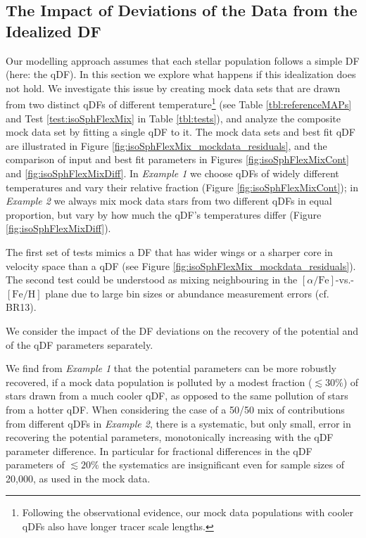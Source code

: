 \subsection{The Impact of Deviations of the Data from the Idealized DF} \label{sec:results_mixedDFs}

Our modelling approach assumes that each stellar population follows a simple DF (here: the qDF). In this section we explore what happens if this idealization does not hold. We investigate this issue by creating mock data sets that are drawn from two distinct qDFs of different temperature\footnote{Following the observational evidence, our mock data populations with cooler qDFs also have longer tracer scale lengths.} (see Table \ref{tbl:referenceMAPs} and Test \ref{test:isoSphFlexMix} in Table \ref{tbl:tests}), and analyze the composite mock data set by fitting a single qDF to it. The mock data sets and best fit qDF are illustrated in Figure \ref{fig:isoSphFlexMix_mockdata_residuals}, and the comparison of input and best fit parameters in Figures \ref{fig:isoSphFlexMixCont} and \ref{fig:isoSphFlexMixDiff}. In \emph{Example 1} we choose qDFs of widely different temperatures and vary their relative fraction (Figure \ref{fig:isoSphFlexMixCont}); in \emph{Example 2} we always mix mock data stars from two different qDFs in equal proportion, but vary by how much the qDF's temperatures differ (Figure \ref{fig:isoSphFlexMixDiff}). 

The first set of tests mimics a DF that has wider wings or a sharper core in velocity space than a qDF (see Figure \ref{fig:isoSphFlexMix_mockdata_residuals}). The second test could be understood as mixing neighbouring \MAPs{} in the $[\alpha/\mathrm{Fe}]$-vs.-$[\mathrm{Fe}/\mathrm{H}]$ plane due to large bin sizes or abundance measurement errors (cf. BR13). 


We consider the impact of the DF deviations on the recovery of the potential and of the qDF parameters separately. 

We find from \emph{Example 1} that the potential parameters can be more robustly recovered, if a mock data population is polluted by a modest fraction ($\lesssim 30\%$) of stars drawn from a much cooler qDF, as opposed to the same pollution of stars from a hotter qDF. When considering the case of a 50/50 mix of contributions from different qDFs in \emph{Example 2}, there is a systematic, but only small, error in recovering the potential parameters, monotonically increasing with the qDF parameter difference. In particular for fractional differences in the qDF parameters of $\lesssim 20\%$ the systematics are insignificant even for sample sizes of 20,000, as used in the mock data.

